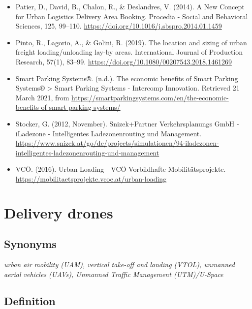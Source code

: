\documentclass[
]{book}
\begin{document}
\begin{itemize}
\item
  Patier, D., David, B., Chalon, R., \& Deslandres, V. (2014). A New Concept for Urban Logistics Delivery Area Booking. Procedia - Social and Behavioral Sciences, 125, 99--110. \url{https://doi.org/10.1016/j.sbspro.2014.01.1459}
\item
  Pinto, R., Lagorio, A., \& Golini, R. (2019). The location and sizing of urban freight loading/unloading lay-by areas. International Journal of Production Research, 57(1), 83--99. \url{https://doi.org/10.1080/00207543.2018.1461269}
\item
  Smart Parking Systems®. (n.d.). The economic benefits of Smart Parking Systems® \textgreater{} Smart Parking Systems - Intercomp Innovation. Retrieved 21 March 2021, from \url{https://smartparkingsystems.com/en/the-economic-benefits-of-smart-parking-systems/}
\item
  Stocker, G. (2012, November). Snizek+Partner Verkehrsplanungs GmbH - iLadezone - Intelligentes Ladezonenrouting und Management. \url{https://www.snizek.at/go/de/projects/simulationen/94-iladezonen-intelligentes-ladezonenrouting-und-management}
\item
  VCÖ. (2016). Urban Loading - VCÖ Vorbildhafte Mobilitätsprojekte. \url{https://mobilitaetsprojekte.vcoe.at/urban-loading}
\end{itemize}

\hypertarget{delivery_drone}{%
\section{Delivery drones}\label{delivery_drone}}

\hypertarget{synonyms-30}{%
\subsection*{Synonyms}\label{synonyms-30}}

\emph{urban air mobility (UAM), vertical take-off and landing (VTOL), unmanned aerial vehicles (UAVs), Unmanned Traffic Management (UTM)/U-Space}

\hypertarget{definition-33}{%
\subsection*{Definition}\label{definition-33}}
\end{document}
